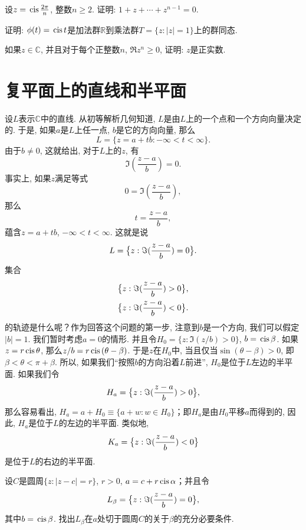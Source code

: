 \begin{exercise}
设$z=\,\text{cis}\,{\frac{2\pi}{n}}$, 整数$n \ge 2$. 证明: $1+z+\cdots+z^{n-1}=0$.
\end{exercise}

\begin{exercise}
证明: $\phi(t)=\,\text{cis}\,{t}$是加法群$\mathbb{R}$到乘法群$T=\{z:|z|=1\}$上的群同态. 
\end{exercise}

\begin{exercise}
如果$z \in \mathbb{C}$, 并且对于每个正整数$n$, $\Re{z^n} \ge 0$, 证明: $z$是正实数. 
\end{exercise}

\section{复平面上的直线和半平面}\label{subsection0020105}
设$L$表示$\mathbb{C}$中的直线. 从初等解析几何知道, $L$是由$L$上的一个点和一个方向向量决定的. 于是, 如果$a$是$L$上任一点, $b$是它的方向向量, 那么
\[
L = \{z = a+tb:-\infty < t < \infty\}.
\]
由于$b \neq 0$, 这就给出, 对于$L$上的$z$, 有
\[
\Im{(\frac{z-a}{b})} = 0.
\]
事实上, 如果$z$满足等式
\[
0 = \Im{(\frac{z-a}{b})},
\]
那么
\[
t = \frac{z-a}{b},
\]
蕴含$z = a + tb$, $-\infty < t < \infty$. 这就是说
\begin{gather}\label{equ002010501}
L = \big{\{} z: \Im{(\frac{z-a}{b})} = 0 \big{\}}.
\end{gather}
集合
\[
\begin{aligned}
&\big{\{} z: \Im{(\frac{z-a}{b})} > 0 \big{\}},\\
&\big{\{} z: \Im{(\frac{z-a}{b})} < 0 \big{\}}.
\end{aligned}
\]
的轨迹是什么呢？作为回答这个问题的第一步, 注意到$b$是一个方向, 我们可以假定$|b|=1$. 我们暂时考虑$a=0$的情形. 并且令$H_0=\{z:\Im{(z/b)}>0\}$, $b = \,\text{cis}\,{\beta}$. 如果$z = r\,\text{cis}\,{\theta}$, 那么$z/b = r\,\text{cis}\,{(\theta-\beta)}$. 于是$z$在$H_0$中, 当且仅当$\sin(\theta-\beta)>0$, 即$\beta < \theta < \pi + \beta$. 所以, 如果我们“按照$b$的方向沿着$L$前进”, $H_0$是位于$L$左边的半平面. 如果我们令
\[
H_a = \big{\{} z: \Im{(\frac{z-a}{b})} > 0 \big{\}},
\]
那么容易看出, $H_a = a + H_0 \equiv \{ a + w: w \in H_0\}$；即$H_a$是由$H_0$平移$a$而得到的, 因此, $H_a$是位于$L$的左边的半平面. 类似地, 
\[
K_a = \big{\{} z: \Im{(\frac{z-a}{b})} < 0 \big{\}}
\]
是位于$L$的右边的半平面. 

\begin{exercise}
设$C$是圆周$\{z:|z-c|=r\}$, $r > 0$, $a = c + r\,\text{cis}\,{\alpha}$；并且令
\[
L_{\beta} = \big{\{} z: \Im{(\frac{z-a}{b})} = 0 \big{\}},
\]
其中$b=\,\text{cis}\,{\beta}$. 找出$L_{\beta}$在$a$处切于圆周$C$的关于$\beta$的充分必要条件. 
\end{exercise}

